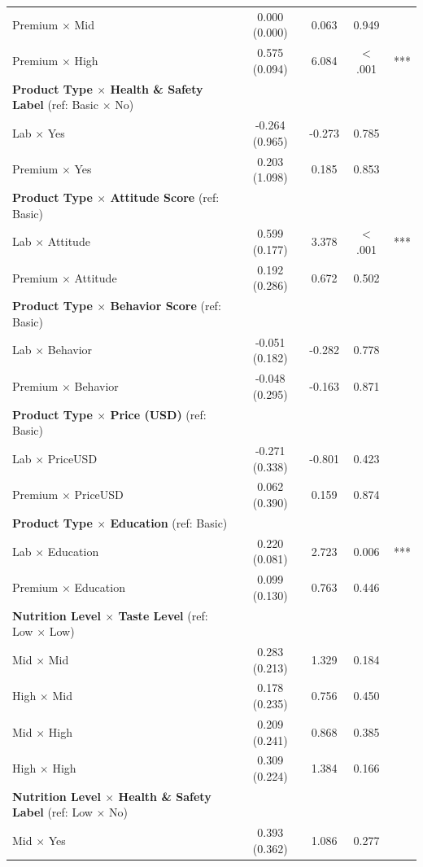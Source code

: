 \begin{center}
\begin{longtable}{lcccc}
\qquad Premium $\times$ Mid & 0.000 (0.000) & 0.063 & 0.949 &  \\
\qquad Premium $\times$ High & 0.575 (0.094) & 6.084 & $<$.001 & *** \\
\quad \textbf{Product Type $\times$ Health \& Safety Label} (ref: Basic $\times$ No) & & & & \\
\qquad Lab $\times$ Yes & -0.264 (0.965) & -0.273 & 0.785 &  \\
\qquad Premium $\times$ Yes & 0.203 (1.098) & 0.185 & 0.853 &  \\
\quad \textbf{Product Type $\times$ Attitude Score} (ref: Basic) & & & & \\
\qquad Lab $\times$ Attitude & 0.599 (0.177) & 3.378 & $<$.001 & *** \\
\qquad Premium $\times$ Attitude & 0.192 (0.286) & 0.672 & 0.502 &  \\
\quad \textbf{Product Type $\times$ Behavior Score} (ref: Basic) & & & & \\
\qquad Lab $\times$ Behavior & -0.051 (0.182) & -0.282 & 0.778 &  \\
\qquad Premium $\times$ Behavior & -0.048 (0.295) & -0.163 & 0.871 &  \\
\quad \textbf{Product Type $\times$ Price (USD)} (ref: Basic) & & & & \\
\qquad Lab $\times$ PriceUSD & -0.271 (0.338) & -0.801 & 0.423 &  \\
\qquad Premium $\times$ PriceUSD & 0.062 (0.390) & 0.159 & 0.874 &  \\
\quad \textbf{Product Type $\times$ Education} (ref: Basic) & & & & \\
\qquad Lab $\times$ Education & 0.220 (0.081) & 2.723 & 0.006 & *** \\
\qquad Premium $\times$ Education & 0.099 (0.130) & 0.763 & 0.446 &  \\
\quad \textbf{Nutrition Level $\times$ Taste Level} (ref: Low $\times$ Low) & & & & \\
\qquad Mid $\times$ Mid & 0.283 (0.213) & 1.329 & 0.184 &  \\
\qquad High $\times$ Mid & 0.178 (0.235) & 0.756 & 0.450 &  \\
\qquad Mid $\times$ High & 0.209 (0.241) & 0.868 & 0.385 &  \\
\qquad High $\times$ High & 0.309 (0.224) & 1.384 & 0.166 &  \\
\quad \textbf{Nutrition Level $\times$ Health \& Safety Label} (ref: Low $\times$ No) & & & & \\
\qquad Mid $\times$ Yes & 0.393 (0.362) & 1.086 & 0.277 &  \\

\end{longtable}
\end{center}
